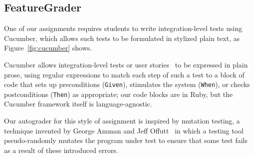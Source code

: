 

\subsection{FeatureGrader}

One of our assignments requires students to write integration-level
tests using Cucumber, which allows such tests to be formulated in
stylized plain text, as Figure~\ref{fig:cucumber} shows.

 Cucumber allows
integration-level tests or user stories~\cite{user-stories} to be
expressed in plain prose, using regular expressions to match each step
of such a test to a block of code that sets up preconditions (\texttt{Given}), stimulates
the system (\texttt{When}), or checks postconditions (\texttt{Then}) as
appropriate; our code blocks are in Ruby, but the Cucumber framework
itself is language-agnostic.  


Our autograder for this
style of assignment is inspired by mutation testing, a technique invented
by George Amman and Jeff 
Offutt~\cite{ammann-offutt-sw-testing} in which a
testing tool pseudo-randomly mutates the program under test to ensure
that some test fails as a result of these introduced errors.



